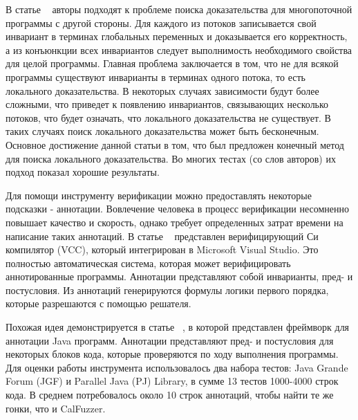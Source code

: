 В статье ~\cite{Cohen:2009} авторы подходят к проблеме поиска доказательства для многопоточной программы с другой стороны. 
Для каждого из потоков записывается свой инвариант в терминах глобальных переменных и доказывается его корректность, а из конъюнкции всех инвариантов следует выполнимость необходимого свойства для целой программы. 
Главная проблема заключается в том, что не для всякой программы существуют инварианты в терминах одного потока, то есть локального доказательства.
В некоторых случаях зависимости будут более сложными, что приведет к появлению инвариантов, связывающих несколько потоков, что будет означать, что локального доказательства не существует.
В таких случаях поиск локального доказательства может быть бесконечным.
Основное достижение данной статьи в том, что был предложен конечный метод для поиска локального доказательства. 
Во многих тестах (со слов авторов) их подход показал хорошие результаты. 

Для помощи инструменту верификации можно предоставлять некоторые подсказки - аннотации. Вовлечение человека в процесс верификации несомненно повышает качество и скорость, однако требует определенных затрат времени на написание таких аннотаций. 
В статье ~\cite{VCC:2009} представлен верифицирующий Си компилятор (VCC), который интегрирован в Microsoft Visual Studio. Это полностью автоматическая система, которая может верифицировать аннотированные программы. Аннотации представляют собой инварианты, пред- и постусловия. Из аннотаций генерируются формулы логики первого порядка, которые разрешаются с помощью решателя.

Похожая идея демонстрируется в статье ~\cite{Burnim:2009}, в которой представлен фреймворк для аннотации Java программ. Аннотации представляют пред- и постусловия для некоторых блоков кода, которые проверяются по ходу выполнения программы. 
Для оценки работы инструмента использовалось два набора тестов: Java Grande Forum (JGF) и Parallel Java (PJ) Library, в сумме 13 тестов 1000-4000 строк кода. В среднем потребовалось около 10 строк аннотаций, чтобы найти те же гонки, что и CalFuzzer. 


